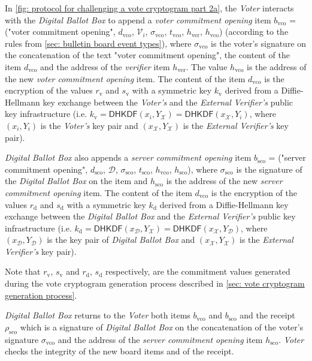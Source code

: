 In \cref{fig: protocol for challenging a vote cryptogram part 2a}, the \textit{Voter} interacts with the \textit{Digital Ballot Box} to append a \textit{voter commitment opening} item $b_\mathrm{vco}$ = ("voter commitment opening", $d_\mathrm{vco}$, $\mathcal{V}_i$, $\sigma_\mathrm{vco}$, $t_\mathrm{vco}$, $h_\mathrm{ver}$, $h_\mathrm{vco}$) (according to the rules from \cref{sec: bulletin board event types}), where $\sigma_\mathrm{vco}$ is the voter's signature on the concatenation of the text "voter commitment opening", the content of the item $d_\mathrm{vco}$ and the address of the \textit{verifier} item $h_\mathrm{ver}$. The value $h_\mathrm{vco}$ is the address of the new \textit{voter commitment opening} item. The content of the item $d_\mathrm{vco}$ is the encryption of the values $r_\mathrm{v}$ and $s_\mathrm{v}$ with a symmetric key $k_\mathrm{v}$ derived from a Diffie-Hellmann key exchange between the \textit{Voter's} and the \textit{External Verifier's} public key infrastructure (i.e. $k_\mathrm{v} = \mathsf{DHKDF}(x_i, Y_\mathcal{X}) = \mathsf{DHKDF}(x_\mathcal{X}, Y_i)$, where $(x_i, Y_i)$ is the \textit{Voter's} key pair and $(x_\mathcal{X}, Y_\mathcal{X})$ is the \textit{External Verifier's} key pair). 

\textit{Digital Ballot Box} also appends a \textit{server commitment opening} item $b_\mathrm{sco}$ = ("server commitment opening", $d_\mathrm{sco}$, $\mathcal{D}$, $\sigma_\mathrm{sco}$, $t_\mathrm{sco}$, $h_\mathrm{vco}$, $h_\mathrm{sco}$), where $\sigma_\mathrm{sco}$ is the signature of the \textit{Digital Ballot Box} on the item and $h_\mathrm{sco}$ is the address of the new \textit{server commitment opening} item. The content of the item $d_\mathrm{vco}$ is the encryption of the values $r_\mathrm{d}$ and $s_\mathrm{d}$ with a symmetric key $k_\mathrm{d}$ derived from a Diffie-Hellmann key exchange between the \textit{Digital Ballot Box} and the \textit{External Verifier's} public key infrastructure (i.e. $k_\mathrm{d} = \mathsf{DHKDF}(x_\mathcal{D}, Y_\mathcal{X}) = \mathsf{DHKDF}(x_\mathcal{X}, Y_\mathcal{D})$, where $(x_\mathcal{D}, Y_\mathcal{D})$ is the key pair of \textit{Digital Ballot Box} and $(x_\mathcal{X}, Y_\mathcal{X})$ is the \textit{External Verifier's} key pair). 

Note that $r_\mathrm{v}$, $s_\mathrm{v}$ and $r_\mathrm{d}$, $s_\mathrm{d}$ respectively, are the commitment values generated during the vote cryptogram generation process described in \cref{sec: vote cryptogram generation process}.

\textit{Digital Ballot Box} returns to the \textit{Voter} both items $b_\mathrm{vco}$ and $b_\mathrm{sco}$ and the receipt $\rho_\mathrm{sco}$ which is a signature of \textit{Digital Ballot Box} on the concatenation of the voter's signature $\sigma_\mathrm{vco}$ and the address of the \textit{server commitment opening} item $h_\mathrm{sco}$. \textit{Voter} checks the integrity of the new board items and of the receipt.

